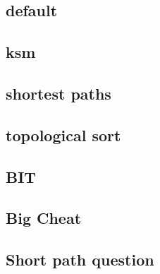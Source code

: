 \documentclass[a4paper,8pt,twocolumn,oneside]{article}
\begin{document}
\pagestyle{fancy}
\fancyfoot{}
\fancyhead[R]{\small \thepage}
\renewcommand{\headrulewidth}{0.4pt}
\renewcommand{\contentsname}{Contents} 

\newcommand{\includetex}[2]{
  \subsection{#1}
  
  \vspace{-1.2em}
}
\scriptsize
\setlength{\parskip}{0pt}
\setlength{\partopsep}{0pt}
\setlength{\topsep}{0pt}
\setlength{\itemsep}{0pt}
\setlength{\parsep}{0pt}



    \subsection*{default}
    

  \subsection*{ksm}
  

    \subsection*{shortest paths}
    
    
    \subsection*{topological sort}
    

    \subsection*{BIT}
    

    \subsection*{Big Cheat}
    

    \subsection*{Short path question}
    
    
\end{document}
